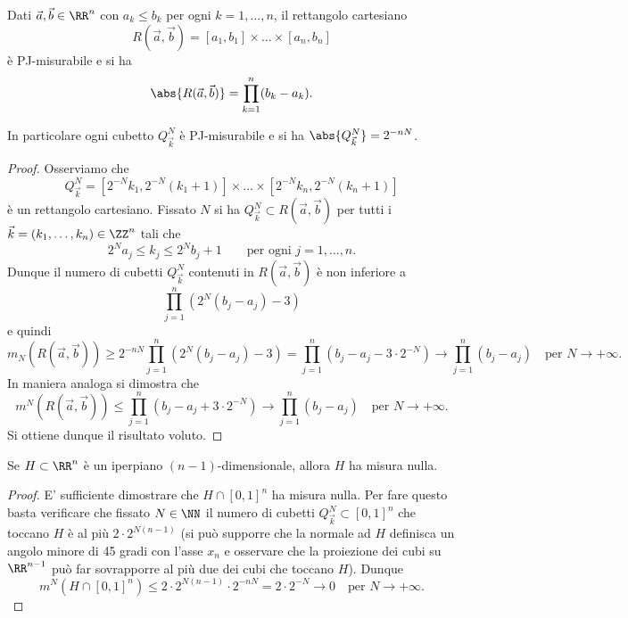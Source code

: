 \begin{exercise}
  \label{ex:misura_rettangolo}
Dati $\vec a,\vec b\in \RR^n$ con $a_k\le b_k$ per ogni $k=1,\ldots,n$,
il rettangolo cartesiano
\[
  R(\vec a, \vec b) = [a_1,b_1]\times \dots \times [a_n,b_n]
\]  
è PJ-misurabile e si ha 
\[
    \abs{R(\vec a, \vec b)} = \prod_{k=1}^n (b_k - a_k).
\]

In particolare ogni cubetto $Q^N_{\vec k}$ è PJ-misurabile e si ha 
$\abs{Q^N_{\vec k}} = 2^{-nN}$.
\end{exercise}
\begin{proof}
Osserviamo che
\[
  Q^N_{\vec k} = [2^{-N} k_1, 2^{-N}(k_1+1)] \times \dots \times [2^{-N} k_n, 2^{-N}(k_n+1)]
\]
è un rettangolo cartesiano.
Fissato $N$ si ha $Q^N_{\vec k} \subset R(\vec a,\vec b)$
per tutti i $\vec k = (k_1,\dots,k_n) \in \ZZ^n$ tali
che
\[
  2^N a_j \le k_j \le 2^N b_j + 1 \qquad \text{per ogni } j=1,\ldots,n.  
\]
Dunque il numero di cubetti $Q^N_{\vec k}$ contenuti in $R(\vec a,\vec b)$ 
è non inferiore a 
\[
  \prod_{j=1}^n (2^N(b_j-a_j)-3)
\]
e quindi 
\[
  m_N(R(\vec a,\vec b)) 
    \ge 2^{-nN} \prod_{j=1}^n (2^N(b_j-a_j)-3)
    = \prod_{j=1}^n (b_j - a_j - 3\cdot 2^{-N})
    \to \prod_{j=1}^n (b_j - a_j) \quad \text{per } N\to +\infty.
\]
In maniera analoga si dimostra che 
\[
  m^N(R(\vec a,\vec b)) 
  \le \prod_{j=1}^n (b_j - a_j + 3\cdot 2^{-N})
  \to \prod_{j=1}^n (b_j - a_j) \quad \text{per } N\to +\infty.
\]
Si ottiene dunque il risultato voluto.
\end{proof}

\begin{exercise}
  \label{ex:iperpiani_misura_nulla}
Se $H\subset \RR^n$ è un iperpiano $(n-1)$-dimensionale, 
allora $H$ ha misura nulla.
\end{exercise}
\begin{proof}
E' sufficiente dimostrare che $H\cap [0,1]^n$ ha misura nulla.
Per fare questo basta verificare che fissato $N\in \NN$ il numero 
di cubetti $Q^N_{\vec k}\subset [0,1]^n$ 
che toccano $H$ è al più $2\cdot 2^{N(n-1)}$ 
(si può supporre che la normale ad $H$ definisca un angolo minore di 45 gradi con 
l'asse $x_n$ e osservare che la proiezione dei cubi su $\RR^{n-1}$ può far sovrapporre 
al più due dei cubi che toccano $H$). 
Dunque
\[
  m^N(H\cap [0,1]^n) \le 2\cdot 2^{N(n-1)} \cdot 2^{-nN} = 2\cdot 2^{-N} \to 0 \quad \text{per } N\to +\infty.
\]
\end{proof}

